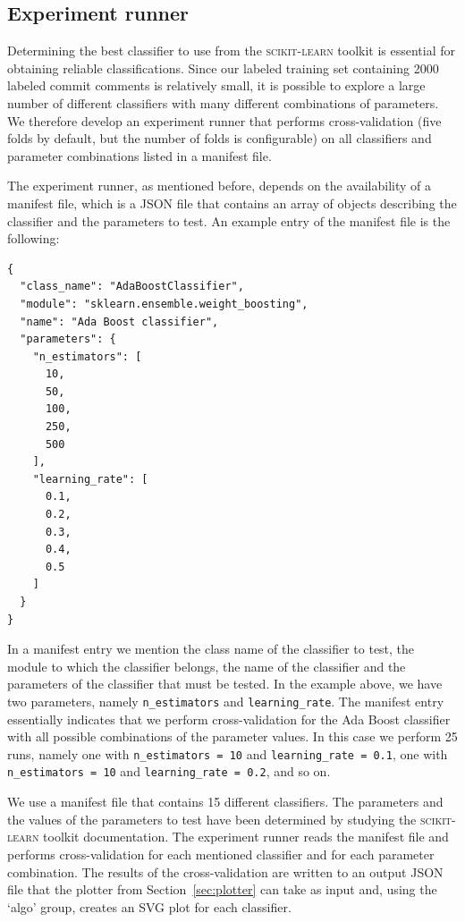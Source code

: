 \documentclass{article}
\begin{document}
\subsection{Experiment runner}\label{sec:experiment-runner}
Determining the best classifier to use from the \textsc{scikit-learn} toolkit is
essential for obtaining reliable classifications. Since our labeled training
set containing 2000 labeled commit comments is relatively small, it is possible
to explore a large number of different classifiers with many different
combinations of parameters. We therefore develop an experiment runner that
performs cross-validation (five folds by default, but the number of folds is
configurable) on all classifiers and parameter combinations listed in a
manifest file.

The experiment runner, as mentioned before, depends on the availability of
a manifest file, which is a JSON file that contains an array of objects
describing the classifier and the parameters to test. An example entry
of the manifest file is the following:

\begin{verbatim}
{
  "class_name": "AdaBoostClassifier",
  "module": "sklearn.ensemble.weight_boosting",
  "name": "Ada Boost classifier",
  "parameters": {
    "n_estimators": [
      10,
      50,
      100,
      250,
      500
    ],
    "learning_rate": [
      0.1,
      0.2,
      0.3,
      0.4,
      0.5
    ]
  }
}
\end{verbatim}

In a manifest entry we mention the class name of the classifier to test, the
module to which the classifier belongs, the name of the classifier and the
parameters of the classifier that must be tested. In the example above, we have 
two parameters, namely {\tt n\_estimators} and
{\tt learning\_rate}. The manifest entry essentially indicates that we perform
cross-validation for the Ada Boost classifier with all possible combinations
of the parameter values. In this case we perform 25 runs, namely one with
{\tt n\_estimators = 10} and {\tt learning\_rate = 0.1}, one with
{\tt n\_estimators = 10} and {\tt learning\_rate = 0.2}, and so on.

We use a manifest file that contains 15 different classifiers. The
parameters and the values of the parameters to test have been determined by
studying the \textsc{scikit-learn} toolkit documentation. The experiment runner
reads the manifest file and performs cross-validation for each mentioned
classifier and for each parameter combination. The results of the
cross-validation are written to an output JSON file that the plotter from
Section~\ref{sec:plotter} can take as input and, using the `algo' group,
creates an SVG plot for each classifier.
\end{document}
